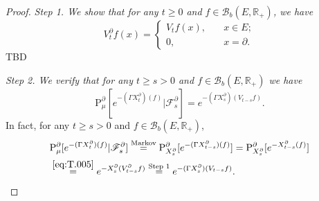 \documentclass[12pt,a4paper]{amsart}
\numberwithin{equation}{section}
\theoremstyle{plain}
\theoremstyle{definition}
\theoremstyle{remark}
\begin{document}
\begin{proof}
	\emph{Step 1. We show that for any $t\geq 0$ and $f\in \mathcal B_b(E,\mathbb R_+)$, we have
\[V_t^\partial f(x) 
= \begin{cases}
	V_tf(x), &\quad x\in E;
	\\0, &\quad x=\partial.
\end{cases}
\]}
	TBD

	\emph{Step 2. We verify that for any $t\geq s>0$ and $f\in \mathcal B_b(E,\mathbb R_+)$ we have 
\[
	\mathrm P_\mu^\partial [e^{- (\Gamma X_t^\partial)(f)} | \mathscr F_s^\partial]
	= e^{- (\Gamma X_s^\partial)(V_{t-s}f)}.
\]}
	In fact, for any $t\geq s>0$ and $f\in \mathcal B_b(E,\mathbb R_+)$,
\begin{align}
	&\mathrm P_\mu^\partial [e^{- (\Gamma X_t^\partial)(f)} | \mathscr F_s^\partial]
	\overset{\text{Markov}}= \mathrm P_{X_s^\partial}^\partial [e^{- (\Gamma X_{t-s}^\partial)(f)} ]
	= \mathrm P_{X_s^\partial}^\partial [e^{- X_{t-s}^\partial(f)} ]
	\\ &\overset{\eqref{eq:T.005}}= e^{- X_s^\partial(V_{t-s}^\partial f)} 
	\overset{\text{Step 1}} = e^{- (\Gamma X_s^\partial)(V_{t-s}f)}.
\end{align}
	

\end{proof}
\end{document}
